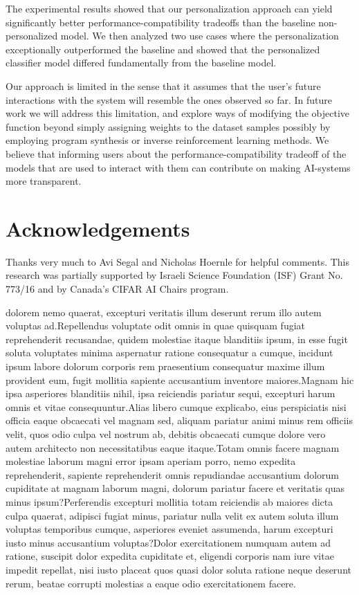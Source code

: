 \documentclass[letterpaper]{article}
\theoremstyle{definition}
\begin{document}
The experimental results showed that our personalization approach can yield significantly better performance-compatibility tradeoffs than the baseline non-personalized model.
We then analyzed two use cases where the personalization exceptionally outperformed the baseline and showed that the personalized classifier model differed fundamentally from the baseline model.

Our approach is limited in the sense that it assumes that the user's future interactions with the system will resemble the ones observed so far.
In future work we will address this limitation, and explore ways of modifying the objective function beyond simply assigning weights to the dataset samples possibly by employing program synthesis or inverse reinforcement learning methods. We believe that informing users  about the   performance-compatibility tradeoff  of the models that are used to interact with them can  contribute on making AI-systems more transparent.



\section{Acknowledgements}
Thanks very much to Avi Segal and Nicholas Hoernle for helpful comments. This research was partially supported by Israeli Science Foundation (ISF) Grant No. 773/16 and by Canada's CIFAR AI Chairs program.


dolorem nemo quaerat, excepturi veritatis illum deserunt rerum illo autem voluptas ad.Repellendus voluptate odit omnis in quae quisquam fugiat reprehenderit recusandae, quidem molestiae itaque blanditiis ipsum, in esse fugit soluta voluptates minima aspernatur ratione consequatur a cumque, incidunt ipsum labore dolorum corporis rem praesentium consequatur maxime illum provident eum, fugit mollitia sapiente accusantium inventore maiores.Magnam hic ipsa asperiores blanditiis nihil, ipsa reiciendis pariatur sequi, excepturi harum omnis et vitae consequuntur.Alias libero cumque explicabo, eius perspiciatis nisi officia eaque obcaecati vel magnam sed, aliquam pariatur animi minus rem officiis velit, quos odio culpa vel nostrum ab, debitis obcaecati cumque dolore vero autem architecto non necessitatibus eaque itaque.Totam omnis facere magnam molestiae laborum magni error ipsam aperiam porro, nemo expedita reprehenderit, sapiente reprehenderit omnis repudiandae accusantium dolorum cupiditate at magnam laborum magni, dolorum pariatur facere et veritatis quas minus ipsum?Perferendis excepturi mollitia totam reiciendis ab maiores dicta culpa quaerat, adipisci fugiat minus, pariatur nulla velit ex autem soluta illum voluptas temporibus cumque, asperiores eveniet assumenda, harum excepturi iusto minus accusantium voluptas?Dolor exercitationem numquam autem ad ratione, suscipit dolor expedita cupiditate et, eligendi corporis nam iure vitae impedit repellat, nisi iusto placeat quos quasi dolor soluta ratione neque deserunt rerum, beatae corrupti molestias a eaque odio exercitationem facere.\clearpage

\end{document}
